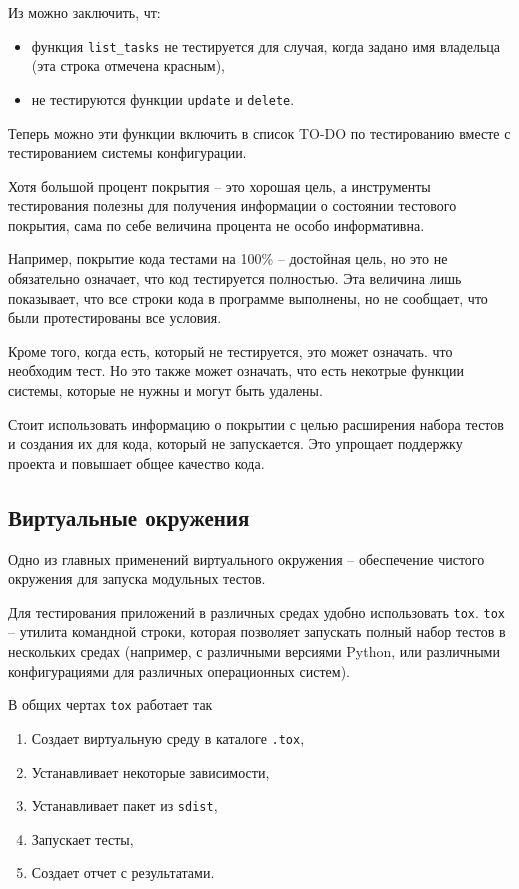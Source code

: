 \documentclass[%
	11pt,
	a4paper,
	utf8,
		]{article}
\begin{document}
Из  можно заключить, чт:
\begin{itemize}
	\item функция \texttt{list\_tasks} не тестируется для случая, когда задано имя владельца (эта строка отмечена красным),
	
	\item не тестируются функции \texttt{update} и \texttt{delete}.
\end{itemize}

Теперь можно эти функции включить в список TO-DO по тестированию вместе с тестированием системы конфигурации.

Хотя большой процент покрытия -- это хорошая цель, а инструменты тестирования полезны для получения информации о состоянии тестового покрытия, сама по себе величина процента не особо информативна.

Например, покрытие кода тестами на 100\% -- достойная цель, но это не обязательно означает, что код тестируется полностью. Эта величина лишь показывает, что все строки кода в программе выполнены, но не сообщает, что были протестированы все условия.

Кроме того, когда есть, который не тестируется, это может означать. что необходим тест. Но это также может означать, что есть некотрые функции системы, которые не нужны и могут быть удалены.

Стоит использовать информацию о покрытии с целью расширения набора тестов и создания их для кода, который не запускается. Это упрощает поддержку проекта и повышает общее качество кода.

\subsection{Виртуальные окружения}

Одно из главных применений виртуального окружения -- обеспечение чистого окружения для запуска модульных тестов.

Для тестирования приложений в различных средах удобно использовать \texttt{tox}. \texttt{tox} -- утилита командной строки, которая позволяет запускать полный набор тестов в нескольких средах (например, с различными версиями Python, или различными конфигурациями для различных операционных систем).

В общих чертах \texttt{tox} работает так
\begin{enumerate}
	\item Создает виртуальную среду в каталоге \texttt{.tox},
	
	\item Устанавливает некоторые зависимости,
	
	\item Устанавливает пакет из \texttt{sdist},
	
	\item Запускает тесты,
	
	\item Создает отчет с результатами.
\end{enumerate}
\end{document}
